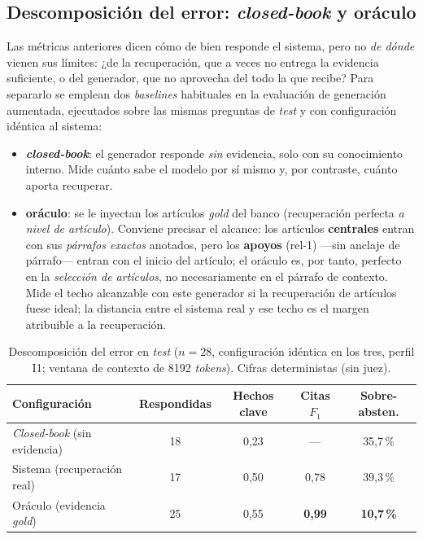 \subsection{Descomposición del error: \emph{closed-book} y oráculo}
\label{subsec:gen-baselines}

Las métricas anteriores dicen cómo de bien responde el sistema, pero no \emph{de dónde} vienen sus límites: ¿de la recuperación, que a veces no entrega la evidencia suficiente, o del generador, que no aprovecha del todo la que recibe? Para separarlo se emplean dos \emph{baselines} habituales en la evaluación de generación aumentada, ejecutados sobre las mismas preguntas de \emph{test} y con configuración idéntica al sistema:

\begin{itemize}
  \item \textbf{\emph{closed-book}}: el generador responde \emph{sin} evidencia, solo con su conocimiento interno. Mide cuánto sabe el modelo por sí mismo y, por contraste, cuánto aporta recuperar.
  \item \textbf{oráculo}: se le inyectan los artículos \emph{gold} del banco (recuperación perfecta \emph{a nivel de artículo}). Conviene precisar el alcance: los artículos \textbf{centrales} entran con sus \emph{párrafos exactos} anotados, pero los \textbf{apoyos} (rel-1) —sin anclaje de párrafo— entran con el inicio del artículo; el oráculo es, por tanto, perfecto en la \emph{selección de artículos}, no necesariamente en el párrafo de contexto. Mide el techo alcanzable con este generador si la recuperación de artículos fuese ideal; la distancia entre el sistema real y ese techo es el margen atribuible a la recuperación.
\end{itemize}

\begin{table}[htbp]
    \centering
    \small
    \renewcommand{\arraystretch}{1.2}
    \caption{Descomposición del error en \emph{test} ($n=28$, configuración idéntica en los tres, perfil I1; ventana de contexto de 8192 \emph{tokens}). Cifras deterministas (sin juez).}
    \label{tab:gen-baselines}
    \begin{tabular}{|l|c|c|c|c|}
        \hline
        \textbf{Configuración} & \textbf{Respondidas} & \textbf{Hechos clave} & \textbf{Citas $F_1$} & \textbf{Sobre-absten.} \\
        \hline
        \emph{Closed-book} (sin evidencia) & 18 & 0,23 & --- & 35,7\,\% \\
        Sistema (recuperación real)        & 17 & 0,50 & 0,78 & 39,3\,\% \\
        Oráculo (evidencia \emph{gold})    & 25 & 0,55 & \textbf{0,99} & \textbf{10,7\,\%} \\
        \hline
    \end{tabular}
\end{table}

